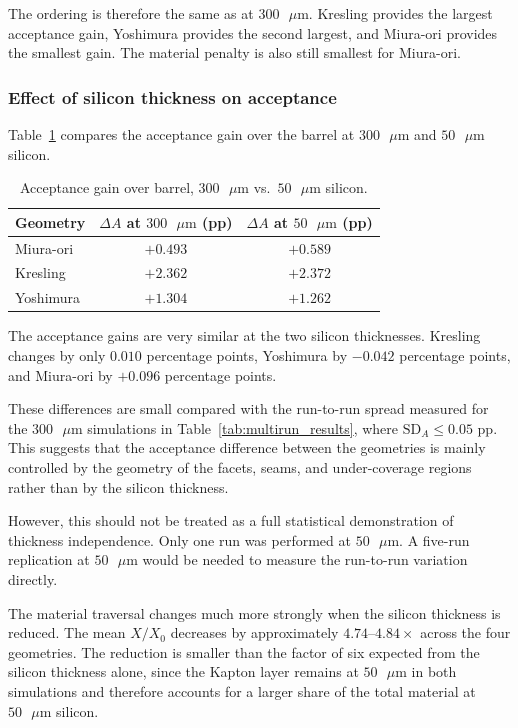 \documentclass[a4paper,11pt]{article}
\begin{document}
The ordering is therefore the same as at $300\text{ }\mu\text{m}$. Kresling provides the largest acceptance gain, Yoshimura provides the second largest, and Miura-ori provides the smallest gain. The material penalty is also still smallest for Miura-ori.

\subsubsection{Effect of silicon thickness on acceptance}

Table~\ref{tab:thin_silicon_thickness_comparison} compares the acceptance gain over the barrel at $300\text{ }\mu\text{m}$ and $50\text{ }\mu\text{m}$ silicon.

\begin{table}[!htbp]
\centering
\caption{Acceptance gain over barrel, $300\text{ }\mu\text{m}$ vs.\ $50\text{ }\mu\text{m}$ silicon.}
\label{tab:thin_silicon_thickness_comparison}
\smallskip
\begin{tabular}{lcc}
\toprule
Geometry  & $\Delta A$ at $300\text{ }\mu\text{m}$ (pp) & $\Delta A$ at $50\text{ }\mu\text{m}$ (pp) \\
\midrule
Miura-ori & $+0.493$ & $+0.589$ \\
Kresling  & $+2.362$ & $+2.372$ \\
Yoshimura & $+1.304$ & $+1.262$ \\
\bottomrule
\end{tabular}
\end{table}

The acceptance gains are very similar at the two silicon thicknesses. Kresling changes by only $0.010$ percentage points, Yoshimura by $-0.042$ percentage points, and Miura-ori by $+0.096$ percentage points.

These differences are small compared with the run-to-run spread measured for the $300\text{ }\mu\text{m}$ simulations in Table~\ref{tab:multirun_results}, where $\mathrm{SD}_A \leq 0.05\text{ pp}$. This suggests that the acceptance difference between the geometries is mainly controlled by the geometry of the facets, seams, and under-coverage regions rather than by the silicon thickness.

However, this should not be treated as a full statistical demonstration of thickness independence. Only one run was performed at $50\text{ }\mu\text{m}$. A five-run replication at $50\text{ }\mu\text{m}$ would be needed to measure the run-to-run variation directly.

The material traversal changes much more strongly when the silicon thickness is reduced. The mean $X/X_0$ decreases by approximately $4.74$--$4.84\times$ across the four geometries. The reduction is smaller than the factor of six expected from the silicon thickness alone, since the Kapton layer remains at $50\text{ }\mu\text{m}$ in both simulations and therefore accounts for a larger share of the total material at $50\text{ }\mu\text{m}$ silicon.
\end{document}
